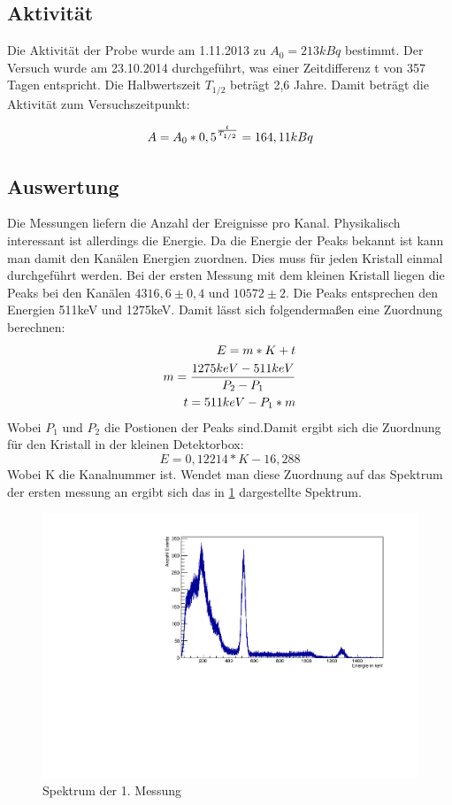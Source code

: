 \documentclass[a4paper,11pt,twoside]{article}
\begin{document}
\subsection{Aktivität}
Die Aktivität der Probe wurde am 1.11.2013 zu $A_0=213 kBq$ bestimmt. Der Versuch wurde am 23.10.2014 durchgeführt, was einer Zeitdifferenz t von 357 Tagen entspricht. Die Halbwertszeit $T_{1/2}$ beträgt 2,6 Jahre. Damit beträgt die Aktivität zum Versuchszeitpunkt:

\begin{equation}
A=A_0*0,5^{t\over T_{1/2}}=164,11 kBq
\end{equation}

\subsection{Auswertung}
Die Messungen liefern die Anzahl der Ereignisse pro Kanal. Physikalisch interessant ist allerdings die Energie. Da die Energie der Peaks bekannt ist kann man damit den Kanälen Energien zuordnen. Dies muss für jeden Kristall einmal durchgeführt werden. Bei der ersten Messung mit dem kleinen Kristall liegen die Peaks bei den Kanälen $4316,6\pm0,4$ und $10572\pm2$. Die Peaks entsprechen den Energien 511keV und 1275keV. 
Damit lässt sich folgendermaßen eine Zuordnung berechnen:
\begin{align}
E=m*K+t\\
m={{1275keV-511keV}\over{P_2-P_1}}\\
t=511keV-P_1*m
\end{align}
Wobei $P_1$ und $P_2$ die Postionen der Peaks sind.Damit ergibt sich die Zuordnung für den Kristall in der kleinen Detektorbox:
\begin{equation}
E=0,12214*K-16,288
\end{equation}
Wobei K die Kanalnummer ist.
Wendet man diese Zuordnung auf das Spektrum der ersten messung an ergibt sich das in \ref{l1} dargestellte Spektrum.
\begin{figure}[htbp]
	\begin{center}
		\includegraphics[width=\textwidth]{Messung11.pdf}
		\caption{Spektrum der 1. Messung}
		\label{l1}
	\end{center}
\end{figure}
\end{document}
